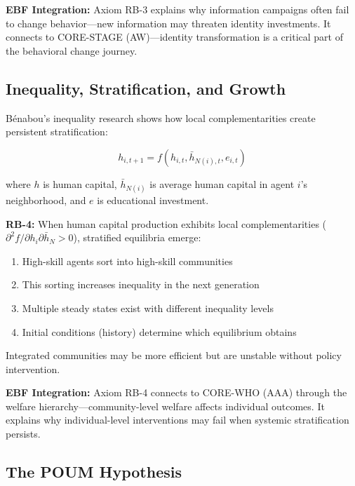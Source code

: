 \textbf{EBF Integration:} Axiom RB-3 explains why information campaigns often fail to change behavior---new information may threaten identity investments. It connects to CORE-STAGE (AW)---identity transformation is a critical part of the behavioral change journey.

\subsection{Inequality, Stratification, and Growth}
\label{subsec:rb-inequality}

Bénabou's inequality research \citep{benabou_1996_inequality_growth, benabou_1996_heterogeneity} shows how local complementarities create persistent stratification:

\begin{equation}
h_{i,t+1} = f(h_{i,t}, \bar{h}_{N(i),t}, e_{i,t})
\label{eq:rb-inequality}
\end{equation}

where $h$ is human capital, $\bar{h}_{N(i)}$ is average human capital in agent $i$'s neighborhood, and $e$ is educational investment.

\begin{axiom}
\label{ax:rb-4}
\textbf{RB-4:} When human capital production exhibits local complementarities ($\partial^2 f / \partial h_i \partial \bar{h}_N > 0$), stratified equilibria emerge:
\begin{enumerate}
    \item High-skill agents sort into high-skill communities
    \item This sorting increases inequality in the next generation
    \item Multiple steady states exist with different inequality levels
    \item Initial conditions (history) determine which equilibrium obtains
\end{enumerate}
Integrated communities may be more efficient but are unstable without policy intervention.
\end{axiom}

\textbf{EBF Integration:} Axiom RB-4 connects to CORE-WHO (AAA) through the welfare hierarchy---community-level welfare affects individual outcomes. It explains why individual-level interventions may fail when systemic stratification persists.

\subsection{The POUM Hypothesis}
\label{subsec:rb-poum}

